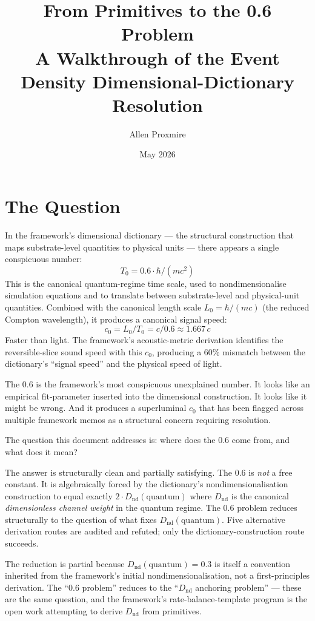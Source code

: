 \documentclass[11pt,a4paper]{article}
\title{\vspace{-1cm}\Large\bfseries From Primitives to the 0.6 Problem\\[6pt]
\large\mdseries A Walkthrough of the Event Density Dimensional-Dictionary Resolution}
\author{Allen Proxmire}
\date{May 2026}
\begin{document}
\maketitle

\section{The Question}

In the framework's dimensional dictionary --- the structural construction that maps substrate-level quantities to physical units --- there appears a single conspicuous number:
\[
T_0 = 0.6 \cdot \hbar/(mc^{2})
\]
This is the canonical quantum-regime time scale, used to nondimensionalise simulation equations and to translate between substrate-level and physical-unit quantities. Combined with the canonical length scale $L_0 = \hbar/(mc)$ (the reduced Compton wavelength), it produces a canonical signal speed:
\[
c_0 = L_0 / T_0 = c / 0.6 \approx 1.667\, c
\]
Faster than light. The framework's acoustic-metric derivation identifies the reversible-slice sound speed with this $c_0$, producing a 60\% mismatch between the dictionary's ``signal speed'' and the physical speed of light.

The 0.6 is the framework's most conspicuous unexplained number. It looks like an empirical fit-parameter inserted into the dimensional construction. It looks like it might be wrong. And it produces a superluminal $c_0$ that has been flagged across multiple framework memos as a structural concern requiring resolution.

The question this document addresses is: where does the 0.6 come from, and what does it mean?

The answer is structurally clean and partially satisfying. The 0.6 is \emph{not} a free constant. It is algebraically forced by the dictionary's nondimensionalisation construction to equal exactly $2 \cdot D_\mathrm{nd}(\mathrm{quantum})$ where $D_\mathrm{nd}$ is the canonical \emph{dimensionless channel weight} in the quantum regime. The 0.6 problem reduces structurally to the question of what fixes $D_\mathrm{nd}(\mathrm{quantum})$. Five alternative derivation routes are audited and refuted; only the dictionary-construction route succeeds.

The reduction is partial because $D_\mathrm{nd}(\mathrm{quantum}) = 0.3$ is itself a convention inherited from the framework's initial nondimensionalisation, not a first-principles derivation. The ``0.6 problem'' reduces to the ``$D_\mathrm{nd}$ anchoring problem'' --- these are the same question, and the framework's rate-balance-template program is the open work attempting to derive $D_\mathrm{nd}$ from primitives.
\end{document}
